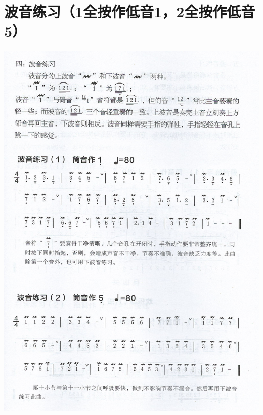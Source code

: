 \documentclass[cn,pad,chinese,chinesefont=nofont]{elegantbook}
\begin{document}
\section{波音练习（1全按作低音1，2全按作低音5）}
\includegraphics[height=\textheight]{dongxiao/Scan 10.jpeg}
\end{document}
